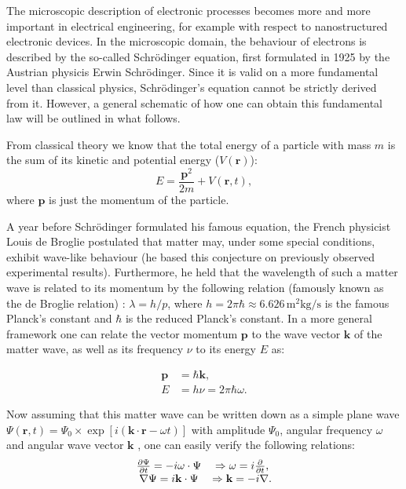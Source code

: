 The microscopic description of electronic processes becomes more and more
important in electrical engineering, for example with respect to
nanostructured electronic devices. In the microscopic domain, the behaviour of
electrons is described by the so-called Schr\"{o}dinger equation, first
formulated in 1925 by the Austrian physicis Erwin Schr\"{o}dinger. Since it is
valid on a more fundamental level than classical physics, Schr\"{o}dinger's
equation cannot be strictly derived from it. However, a general schematic of
how one can obtain this fundamental law will be outlined in what follows.

From classical theory we know that the total energy of a particle with mass
$m$ is the sum of its kinetic and potential energy ($V(\mathbf{r})$):
\begin{equation}
E=\frac{\mathbf{p}^{2}}{2m}+V(\mathbf{r},t),\label{eq:hamiltonequation}%
\end{equation}
where $\mathbf{p}$ is just the momentum of the particle.

A year before Schr\"{o}dinger formulated his famous equation, the French
physicist Louis de Broglie postulated that matter may, under some special
conditions, exhibit wave-like behaviour (he based this conjecture on
previously observed experimental results). Furthermore, he held that the
wavelength of such a matter wave is related to its momentum by the following
relation (famously known as the de Broglie relation) : $\lambda=h/p$, where
$h=2\pi\hbar\approx6.626\,\mathrm{m}^{2}\mathrm{kg}/\mathrm{s}$ is the famous
Planck's constant and $\hbar$ is the reduced Planck's constant. In a more
general framework one can relate the vector momentum $\mathbf{p}$ to the wave
vector $\mathbf{k}$ of the matter wave, as well as its frequency $\nu$ to its
energy $E$ as:%

\begin{align}
\mathbf{p}  &  =\hbar\mathbf{k},\nonumber\\
E  &  =h\nu=2\pi\hbar\omega. \label{eq:debroglierelations}%
\end{align}

Now assuming that this matter wave can be written down as a simple plane wave
$\Psi(\mathbf{r},t)=\Psi_{0}\times\exp\left[  i(\mathbf{k}\cdot\mathbf{r}%
-\omega t)\right]  $ with amplitude $\Psi_{0}$, angular frequency $\omega$ and
angular wave vector $\mathbf{k}$ , one can easily verify the following
relations:%
\begin{equation}%
\begin{array}
[c]{cc}%
\frac{\partial\Psi}{\partial t}=-i\omega\cdot\Psi & \Rightarrow\omega
=i\frac{\partial}{\partial t},\\
\mathbf{\nabla}\Psi=i\mathbf{k}\cdot\Psi & \Rightarrow\mathbf{k}%
=-i\mathbf{\nabla}.
\end{array}
\label{eq:firstquantization}%
\end{equation}

